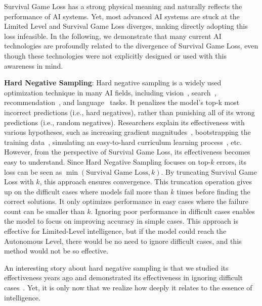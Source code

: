 Survival Game Loss has a strong physical meaning and naturally reflects the performance of AI systems. Yet, most advanced AI systems are stuck at the Limited Level and Survival Game Loss diverges, making directly adopting this loss infeasible. In the following, we demonstrate that many current AI technologies are profoundly related to the divergence of Survival Game Loss, even though these technologies were not explicitly designed or used with this awareness in mind.


\textbf{Hard Negative Sampling}:
Hard negative sampling is a widely used optimization technique in many AI fields, including vision~\citep{shrivastava2016training}, search~\citep{zhan2021optimizing}, recommendation~\citep{ding2020simplify}, and language~\citep{kalantidis2020hard} tasks. It penalizes the model's top-k most incorrect predictions (i.e., hard negatives), rather than punishing all of its wrong predictions (i.e., random negatives). Researchers explain its effectiveness with various hypotheses, such as increasing gradient magnitudes~\citep{xiong2021approximate}, bootstrapping the training data~\citep{shrivastava2016training}, simulating an easy-to-hard curriculum learning process~\citep{chen2021curriculum}, etc. However, from the perspective of Survival Game Loss, its effectiveness becomes easy to understand. Since Hard Negative Sampling focuses on top-$k$ errors, its loss can be seen as $\min (\text{Survival Game Loss}, k)$. By truncating Survival Game Loss with $k$, this approach ensures convergence. This truncation operation gives up on the difficult cases where models fail more than $k$ times before finding the correct solutions. It only optimizes performance in easy cases where the failure count can be smaller than $k$. Ignoring poor performance in difficult cases enables the model to focus on improving accuracy in simple cases. This approach is effective for Limited-Level intelligence, but if the model could reach the Autonomous Level, there would be no need to ignore difficult cases, and this method would not be so effective.

An interesting story about hard negative sampling is that we studied its effectiveness years ago and demonstrated its effectiveness in ignoring difficult cases~\citep{zhan2021optimizing}. Yet, it is only now that we realize how deeply it relates to the essence of intelligence.

